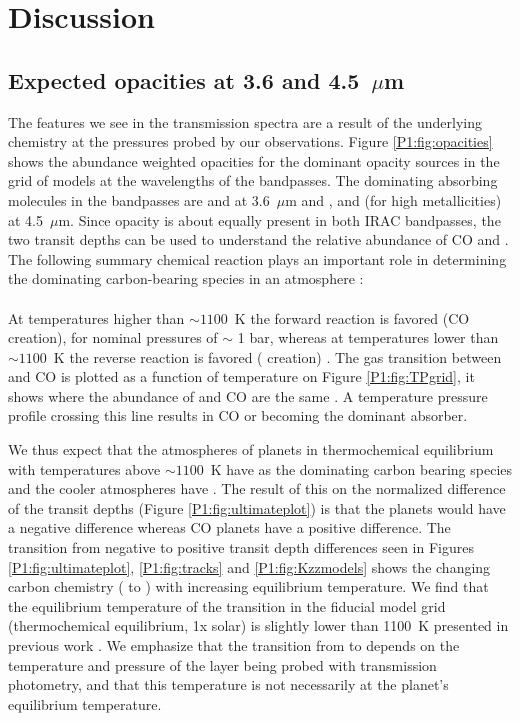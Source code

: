 \section{Discussion}
\label{P1:sec:Discussion}

\subsection{Expected opacities at 3.6 and 4.5~$\mu$m}
\label{P1:subsec:Chemistry}

The features we see in the transmission spectra are a result of the underlying chemistry at the pressures probed by our observations. Figure \ref{P1:fig:opacities} shows the abundance weighted opacities for the dominant opacity sources in the grid of models at the wavelengths of the \spitzer bandpasses. The dominating absorbing molecules in the \spitzer bandpasses are  and  at 3.6~$\mu$m and ,  and  (for high metallicities) at 4.5~$\mu$m. Since  opacity is about equally present in both IRAC bandpasses, the two \spitzer transit depths can be used to understand the relative abundance of CO and . The following summary chemical reaction plays an important role in determining the dominating carbon-bearing species in an atmosphere \citep[e.g.,][]{Visscher2010, Moses2011, Visscher2011, Ebbing2016}:
\\
\\
At temperatures higher than $\sim1100$~K the forward reaction is favored (CO creation), for nominal pressures of $\sim$ 1 bar, whereas at temperatures lower than $\sim1100$~K the reverse reaction is favored ( creation) \citep[e.g.][]{Madhusudhan2012, Molliere2015, Molaverdikhani2019}. The gas transition between  and CO is plotted as a function of temperature on Figure \ref{P1:fig:TPgrid}, it shows where the abundance of  and CO are the same \citet{Visscher2012}. A temperature pressure profile crossing this line results in CO or  becoming the dominant absorber.

We thus expect that the atmospheres of planets in thermochemical equilibrium with temperatures above $\sim1100$~K have  as the dominating carbon bearing species and the cooler atmospheres have . The result of this on the normalized difference of the transit depths (Figure \ref{P1:fig:ultimateplot}) is that the  planets would have a negative difference whereas CO planets have a positive difference. The transition from negative to positive transit depth differences seen in Figures \ref{P1:fig:ultimateplot}, \ref{P1:fig:tracks} and \ref{P1:fig:Kzzmodels} shows the changing carbon chemistry ( to ) with increasing equilibrium temperature. We find that the equilibrium temperature of the transition in the fiducial model grid (thermochemical equilibrium, 1x solar) is slightly lower than 1100~K presented in previous work \citep[e.g.,][]{Madhusudhan2012}. We emphasize that the transition from  to  depends on the temperature and pressure of the layer being probed with \spitzerIRAC transmission photometry, and that this temperature is not necessarily at the planet's equilibrium temperature.

